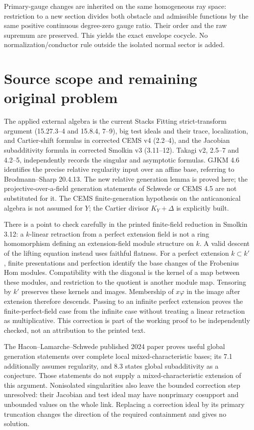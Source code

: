 \documentclass[11pt]{article}
\begin{document}
Primary-gauge changes are inherited on the same homogeneous ray space:
restriction to a new section divides both obstacle and admissible functions
by the same positive continuous degree-zero gauge ratio. Their order and
the raw supremum are preserved. This yields the exact envelope cocycle.
No normalization/conductor rule outside the isolated normal sector is added.

\section{Source scope and remaining original problem}
The applied external algebra is the current Stacks Fitting strict-transform
argument (15.27.3--4 and 15.8.4, 7--9), big test ideals and their trace,
localization, and Cartier-shift formulas in corrected CEMS v4 (2.2--4),
and the Jacobian subadditivity formula in corrected Smolkin v3 (3.11--12).
Takagi v2, 2.5--7 and 4.2--5, independently records the singular and
asymptotic formulas. GJKM 4.6 identifies the precise relative regularity
input over an affine base, referring to Brodmann--Sharp 20.4.13.
The new relative generation lemma is proved here; the projective-over-a-field
generation statements of Schwede or CEMS 4.5 are not substituted for it.
The CEMS finite-generation hypothesis on the anticanonical algebra is
not assumed for $Y$; the Cartier divisor $K_Y+\Delta$ is explicitly built.

There is a point to check carefully in the printed finite-field reduction
in Smolkin 3.12: a $k$-linear retraction from a perfect extension field is
not a ring homomorphism defining an extension-field module structure on
$k$. A valid descent of the lifting equation instead uses faithful flatness.
For a perfect extension $k\subset k'$, finite presentations and perfection
identify the base changes of the Frobenius Hom modules. Compatibility with
the diagonal is the kernel of a map between these modules, and restriction
to the quotient is another module map. Tensoring by $k'$ preserves these
kernels and images. Membership of $x\varphi$ in the image after extension
therefore descends. Passing to an infinite perfect extension proves the
finite-perfect-field case from the infinite case without treating a linear
retraction as multiplicative. This correction is part of the working proof
to be independently checked, not an attribution to the printed text.

The Hacon--Lamarche--Schwede published 2024 paper proves useful global
generation statements over complete local mixed-characteristic bases;
its 7.1 additionally assumes regularity, and 8.3 states global
subadditivity as a conjecture. Those statements do not supply a
mixed-characteristic extension of this argument. Nonisolated singularities
also leave the bounded correction step unresolved: their Jacobian and test
ideal may have nonprimary cosupport and unbounded values on the whole link.
Replacing a correction ideal by its primary truncation changes the direction
of the required containment and gives no solution.
\end{document}
